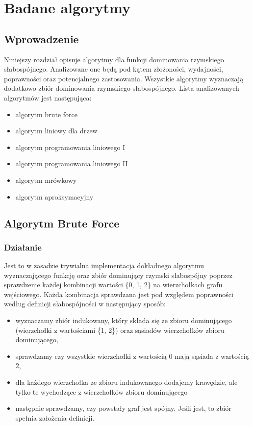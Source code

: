 \chapter{Badane algorytmy}

\section{Wprowadzenie}
Niniejszy rozdział opisuje algorytmy dla funkcji dominowania rzymskiego słabospójnego. Analizowane one będą pod kątem złożoności, wydajności, poprawności oraz potencjalnego zastosowania. Wszystkie algorytmy wyznaczają dodatkowo zbiór dominowania rzymskiego słabospójnego. Lista analizowanych algorytmów jest następująca:

\begin{itemize}
    \item algorytm brute force
    \item algorytm liniowy dla drzew
    \item algorytm programowania liniowego I
    \item algorytm programowania liniowego II
    \item algorytm mrówkowy
    \item algorytm aproksymacyjny
\end{itemize}

\section{Algorytm Brute Force}

\subsection{Działanie}
Jest to w zasadzie trywialna implementacja dokładnego algorytmu wyznaczającego funkcję oraz zbiór dominujący rzymski słabospójny poprzez sprawdzenie każdej kombinacji wartości \{0, 1, 2\} na wierzchołkach grafu wejściowego. Każda kombinacja sprawdzana jest pod względem poprawności według definicji słabospójności w następujący sposób:
\begin{itemize}
    \item wyznaczamy zbiór indukowany, który składa się ze zbioru dominującego (wierzchołki z wartościami \{1, 2\}) oraz sąsiadów wierzchołków zbioru dominującego,
    \item sprawdzamy czy wszystkie wierzchołki z wartością 0 mają sąsiada z wartością 2,
    \item dla każdego wierzchołka ze zbioru indukowanego dodajemy krawędzie, ale tylko te wychodzące z wierzchołków zbioru dominującego
    \item następnie sprawdzamy, czy powstały graf jest spójny. Jeśli jest, to zbiór spełnia założenia definicji.
\end{itemize}

